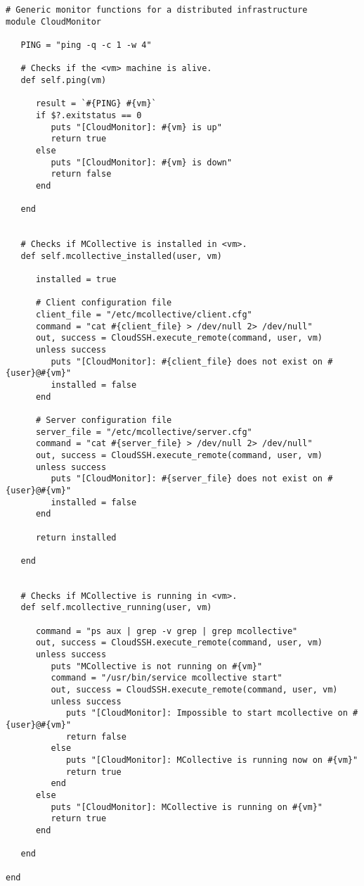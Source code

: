 \begin{lstlisting}
# Generic monitor functions for a distributed infrastructure
module CloudMonitor

   PING = "ping -q -c 1 -w 4"

   # Checks if the <vm> machine is alive.
   def self.ping(vm)

      result = `#{PING} #{vm}`
      if $?.exitstatus == 0
         puts "[CloudMonitor]: #{vm} is up"
         return true
      else
         puts "[CloudMonitor]: #{vm} is down"
         return false
      end
      
   end


   # Checks if MCollective is installed in <vm>.
   def self.mcollective_installed(user, vm)
      
      installed = true
      
      # Client configuration file
      client_file = "/etc/mcollective/client.cfg"
      command = "cat #{client_file} > /dev/null 2> /dev/null"
      out, success = CloudSSH.execute_remote(command, user, vm)
      unless success
         puts "[CloudMonitor]: #{client_file} does not exist on #{user}@#{vm}"
         installed = false
      end

      # Server configuration file
      server_file = "/etc/mcollective/server.cfg"
      command = "cat #{server_file} > /dev/null 2> /dev/null"
      out, success = CloudSSH.execute_remote(command, user, vm)
      unless success
         puts "[CloudMonitor]: #{server_file} does not exist on #{user}@#{vm}"
         installed = false
      end
      
      return installed
      
   end


   # Checks if MCollective is running in <vm>.
   def self.mcollective_running(user, vm)
      
      command = "ps aux | grep -v grep | grep mcollective"
      out, success = CloudSSH.execute_remote(command, user, vm)
      unless success
         puts "MCollective is not running on #{vm}"
         command = "/usr/bin/service mcollective start"
         out, success = CloudSSH.execute_remote(command, user, vm)
         unless success
            puts "[CloudMonitor]: Impossible to start mcollective on #{user}@#{vm}"
            return false
         else
            puts "[CloudMonitor]: MCollective is running now on #{vm}"
            return true
         end
      else
         puts "[CloudMonitor]: MCollective is running on #{vm}"
         return true
      end
      
   end
   
end
\end{lstlisting}


